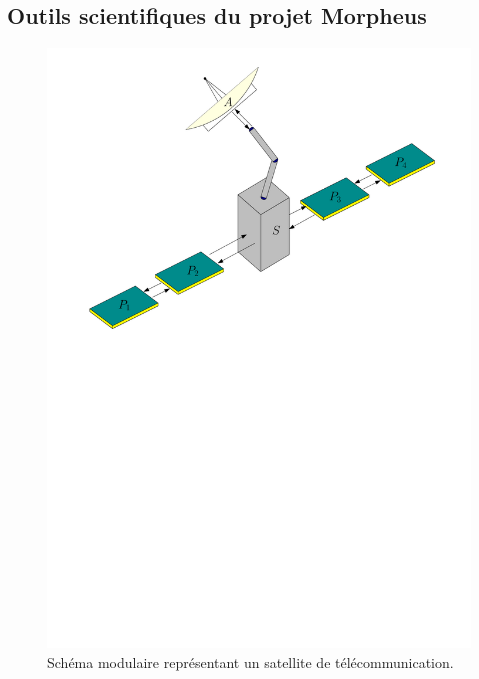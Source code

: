 \documentclass[12pt, french]{article}
\begin{document}
\subsection{Outils scientifiques du projet Morpheus}

\begin{figure}[tb]
	\centering
	\includegraphics[width=.6\textwidth]{satellite.pdf}
	\caption{Schéma modulaire représentant un satellite de télécommunication.}
	\label{fig:satellite}
\end{figure}
\end{document}
